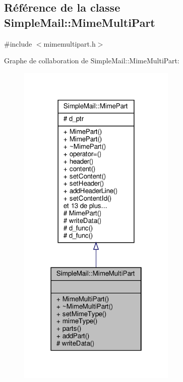 \hypertarget{class_simple_mail_1_1_mime_multi_part}{}\subsection{Référence de la classe Simple\+Mail\+:\+:Mime\+Multi\+Part}
\label{class_simple_mail_1_1_mime_multi_part}


{\ttfamily \#include $<$mimemultipart.\+h$>$}



Graphe de collaboration de Simple\+Mail\+:\+:Mime\+Multi\+Part\+:\nopagebreak
\begin{figure}[H]
\begin{center}
\leavevmode
\includegraphics[width=214pt]{class_simple_mail_1_1_mime_multi_part__coll__graph}
\end{center}
\end{figure}

